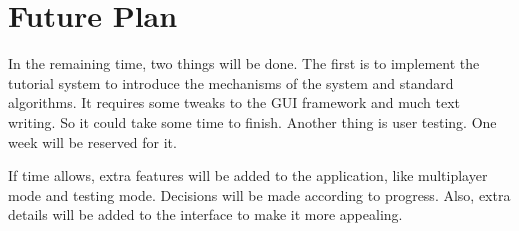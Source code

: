 \documentclass[11pt]{article}
\begin{document}
\section{Future Plan}

In the remaining time, two things will be done. The first is to implement the tutorial system to introduce the mechanisms of the system and standard algorithms. It requires some tweaks to the GUI framework and much text writing. So it could take some time to finish. Another thing is user testing. One week will be reserved for it.

If time allows, extra features will be added to the application, like multiplayer mode and testing mode. Decisions will be made according to 
progress. Also, extra details will be added to the interface to make it more appealing.
\end{document}
